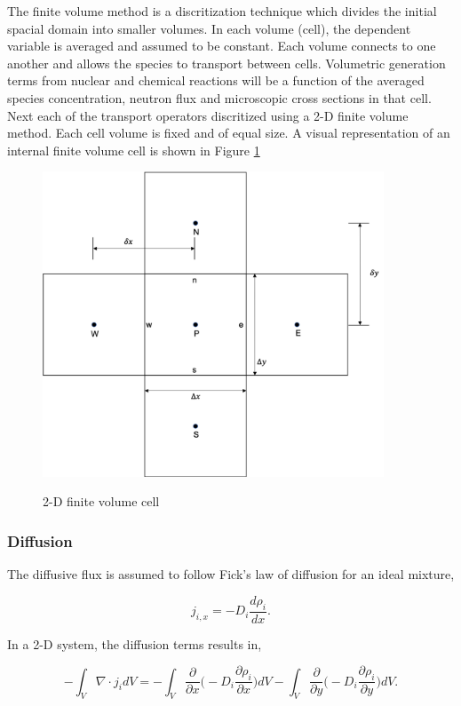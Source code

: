 The finite volume method is a discritization technique which divides the initial spacial domain into smaller volumes. In each volume (cell), the dependent variable is averaged and assumed to be constant. Each volume connects to one another and allows the species to transport between cells. Volumetric generation terms from nuclear and chemical reactions will be a function of the averaged species concentration, neutron flux and microscopic cross sections in that cell. Next each of the transport operators discritized using a 2-D finite volume method. Each cell volume is fixed and of equal size. A visual representation of an internal finite volume cell is shown in Figure \ref{fig:2DFiniteVolume}

\begin{figure}[t]
  \centering
  \includegraphics[width=4in]{images/2DFiniteVoluem.png}\\
  \caption{2-D finite volume cell}
  \label{fig:2DFiniteVolume}
\end{figure} 
 
\subsubsection{Diffusion}
The diffusive flux is assumed to follow Fick's law of diffusion for an ideal mixture,

\begin{equation}
    j_{i,x} = -D_{i}\frac{d\rho_{i}}{dx}.
\end{equation}

\noindent In a 2-D system, the diffusion terms results in,

\begin{equation}
    -\int_{V}\nabla \cdot j_{i}dV = -\int_{V}\frac{\partial }{\partial x}\bigg( -D_{i}\frac{\partial \rho_{i}}{\partial x}\bigg)dV - \int_{V}\frac{\partial }{\partial y}\bigg( -D_{i}\frac{\partial \rho_{i}}{\partial y}\bigg)dV.
\end{equation}

